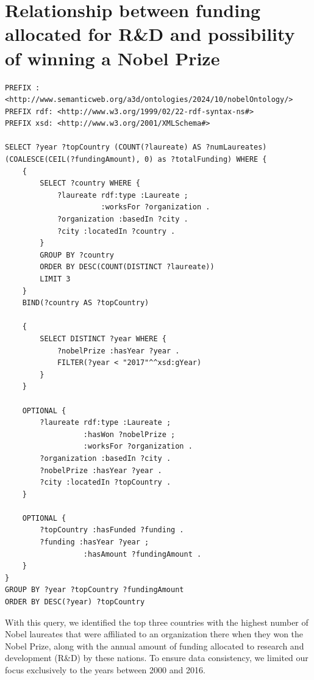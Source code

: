 \documentclass{article}
\begin{document}
\newpage

\section{Relationship between funding allocated for R\&D and possibility of winning a Nobel Prize}
\label{sec:fundings}
\begin{lstlisting}
PREFIX : <http://www.semanticweb.org/a3d/ontologies/2024/10/nobelOntology/>
PREFIX rdf: <http://www.w3.org/1999/02/22-rdf-syntax-ns#>
PREFIX xsd: <http://www.w3.org/2001/XMLSchema#>

SELECT ?year ?topCountry (COUNT(?laureate) AS ?numLaureates) (COALESCE(CEIL(?fundingAmount), 0) as ?totalFunding) WHERE {
    {
        SELECT ?country WHERE {
            ?laureate rdf:type :Laureate ;
                      :worksFor ?organization .
            ?organization :basedIn ?city .
            ?city :locatedIn ?country .
        }
        GROUP BY ?country
        ORDER BY DESC(COUNT(DISTINCT ?laureate))
        LIMIT 3
    }
    BIND(?country AS ?topCountry)

    {
        SELECT DISTINCT ?year WHERE {
            ?nobelPrize :hasYear ?year .
            FILTER(?year < "2017"^^xsd:gYear)
        }
    }

    OPTIONAL {
        ?laureate rdf:type :Laureate ;
                  :hasWon ?nobelPrize ;
                  :worksFor ?organization .
        ?organization :basedIn ?city .
        ?nobelPrize :hasYear ?year .
        ?city :locatedIn ?topCountry .
    }

    OPTIONAL {
        ?topCountry :hasFunded ?funding .
        ?funding :hasYear ?year ;
                  :hasAmount ?fundingAmount .
    }
}
GROUP BY ?year ?topCountry ?fundingAmount
ORDER BY DESC(?year) ?topCountry
\end{lstlisting}

\vspace{1em}

With this query, we identified the top three countries with the highest number of Nobel laureates that were affiliated
to an organization there when they won the Nobel Prize, along with the annual amount of funding allocated to
research and development (R\&D) by these nations. To ensure data consistency, we limited our focus exclusively to
the years between 2000 and 2016.
\end{document}
